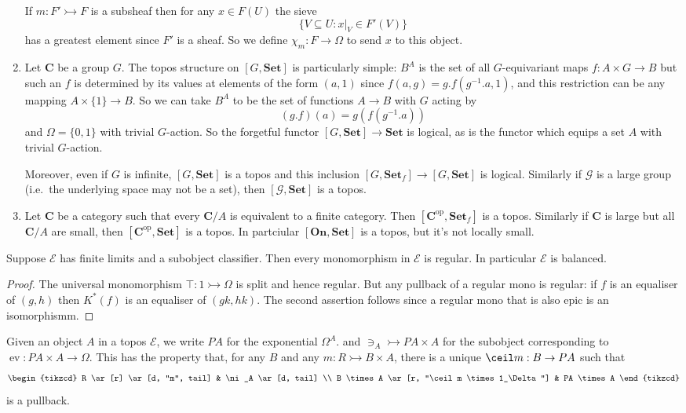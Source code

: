 \documentclass[a4paper]{article}
\renewcommand{\c}[1]{\mathbf{#1}}
\newcommand{\Set}{{\c{Set}}}
\newcommand{\mono}{\rightarrowtail}
\DeclareMathOperator{\ev}{ev} %
\begin{document}
\begin{eg}
\begin{enumerate}
    If \(m: F' \mono F\) is a subsheaf then for any \(x \in F(U)\) the sieve
    \[
      \{V \subseteq U: x|_V \in F'(V)\}
    \]
    has a greatest element since \(F'\) is a sheaf. So we define \(\chi_m: F \to \Omega\) to send \(x\) to this object.
  \item Let \(\c C\) be a group \(G\). The topos structure on \([G, \Set]\) is particularly simple: \(B^A\) is the set of all \(G\)-equivariant maps \(f: A \times G \to B\) but such an \(f\) is determined by its values at elements of the form \((a, 1)\) since \(f(a, g) = g . f(g^{-1} . a, 1)\), and this restriction can be any mapping \(A \times \{1\} \to B\). So we can take \(B^A\) to be the set of functions \(A \to B\) with \(G\) acting by
    \[
      (g . f) (a) = g(f(g^{-1} . a))
    \]
    and \(\Omega = \{0, 1\}\) with trivial \(G\)-action. So the forgetful functor \([G, \Set] \to \Set\) is logical, as is the functor which equips a set \(A\) with trivial \(G\)-action.

    Moreover, even if \(G\) is infinite, \([G, \Set]\) is a topos and this inclusion \([G, \Set_f] \to [G, \Set]\) is logical. Similarly if \(\mathcal G\) is a large group (i.e.\ the underlying space may not be a set), then \([\mathcal G, \Set]\) is a topos.
  \item Let \(\c C\) be a category such that every \(\c C/A\) is equivalent to a finite category. Then \([\c C^{\text{op}}, \Set_f]\) is a topos. Similarly if \(\c C\) is large but all \(\c C/A\) are small, then \([\c C^{\text{op}}, \Set]\) is a topos. In partciular \([\c{On}, \Set]\) is a topos, but it's not locally small.
  \end{enumerate}
\end{eg}

\begin{lemma}
  Suppose \(\mathcal E\) has finite limits and a subobject classifier. Then every monomorphism in \(\mathcal E\) is regular. In particular \(\mathcal E\) is balanced.
\end{lemma}

\begin{proof}
  The universal monomorphism \(\top: 1 \mono \Omega\) is split and hence regular. But any pullback of a regular mono is regular: if \(f\) is an equaliser of \((g, h)\) then \(K^*(f)\) is an equaliser of \((gk, hk)\). The second assertion follows since a regular mono that is also epic is an isomorphismm.
\end{proof}

Given an object \(A\) in a topos \(\mathcal E\), we write \(PA\) for the exponential \(\Omega^A\). and \(\ni_A \mono PA \times A\) for the subobject corresponding to \(\ev: PA \times A \to \Omega\). This has the property that, for any \(B\) and any \(m: R \mono B \times A\), there is a unique \(\ceil m: B \to PA\) %
such that
\[
  \begin{tikzcd}
    R \ar[r] \ar[d, "m", tail] & \ni_A \ar[d, tail] \\
    B \times A \ar[r, "\ceil m \times 1_\Delta"] & PA \times A
  \end{tikzcd}
\]
is a pullback.
\end{document}
